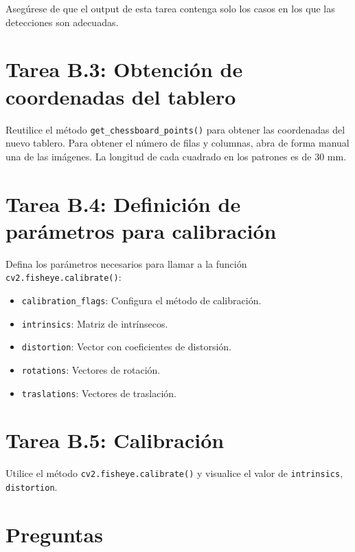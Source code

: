 Asegúrese de que el output de esta tarea contenga solo los casos en los que las detecciones son adecuadas.

\section*{Tarea B.3: Obtención de coordenadas del tablero}
Reutilice el método \texttt{get\_chessboard\_points()} para obtener las coordenadas del nuevo tablero. Para obtener el número de filas y columnas, abra de forma manual una de las imágenes. La longitud de cada cuadrado en los patrones es de 30 mm.

\section*{Tarea B.4: Definición de parámetros para calibración}

Defina los parámetros necesarios para llamar a la función \texttt{cv2.fisheye.calibrate()}:

\begin{itemize}
    \item \texttt{calibration\_flags}: Configura el método de calibración.
    \item \texttt{intrinsics}: Matriz de intrínsecos.
    \item \texttt{distortion}: Vector con coeficientes de distorsión.
    \item \texttt{rotations}: Vectores de rotación.
    \item \texttt{traslations}: Vectores de traslación.
\end{itemize}


\section*{Tarea B.5: Calibración}

Utilice el método \texttt{cv2.fisheye.calibrate()} y visualice el valor de \texttt{intrinsics}, \texttt{distortion}.

\newpage
\section*{Preguntas}

